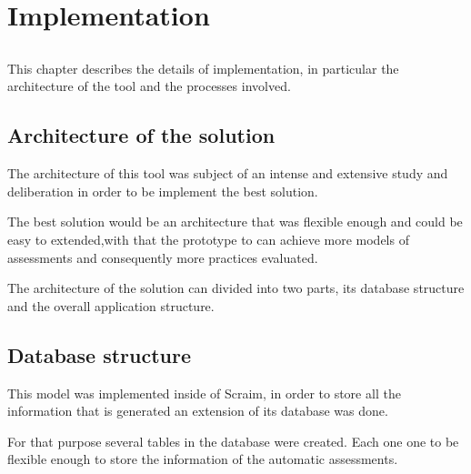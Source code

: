 \chapter{Implementation} \label{chap:implementation}

\section*{}

This chapter describes the details of implementation, in particular the architecture of the tool and the processes involved.

\section{Architecture of the solution} \label{sec:evaluation}
The architecture of this tool was subject of an intense and extensive study and deliberation in order to be implement the best solution.

The best solution would be an architecture that was flexible enough and could be easy to extended,with that the prototype to can achieve more models of assessments and consequently more practices evaluated.

The architecture of the solution can divided into two parts, its database structure and the overall application structure.

\section{Database structure}\label{database}

This model was implemented inside of Scraim, in order to store all the information that is generated an extension of its database was done.

For that purpose several tables in the database were created. Each one one to be flexible enough to store the information of the automatic assessments.


